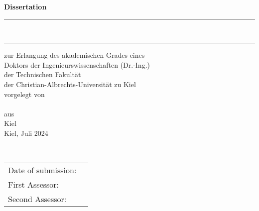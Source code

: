 \begin{center}
	\fontsize{16}{18}\selectfont
	{\textbf{\huge Dissertation}} \\
	\vspace{2cm}
	\hrule
	\vspace{0.4cm}
	\textbf{\Large \MAtitle}\\
	\vspace{0.3cm}
	\hrule
	\vspace{2cm}
	{\large zur Erlangung des akademischen Grades eines \\ Doktors der Ingenieurswissenschaften (Dr.-Ing.) \\ der Technischen Fakultät \\ der Christian-Albrechts-Universität zu Kiel} \\
	\vspace{2cm}	
          {\small vorgelegt von} \\
	\vspace{0.2cm}		
	\large{\Author} \\
	\vspace{1cm}
         {\small aus} \\
	\vspace{0.2cm}
	{\large Kiel} \\
	\vspace{2cm}	
	{\large Kiel, Juli 2024} \\
	\vspace{1cm}
	\vspace{1cm}
	
	
\end{center}
\newpage

\ \vfill
\begin{tabularx}{0.9\textwidth}{l l}
	Date of submission: & \DateOfSubmission \\
	First Assessor: &\CorrectorA \\
	Second Assessor: & \CorrectorB \\
\end{tabularx}	
\newpage
